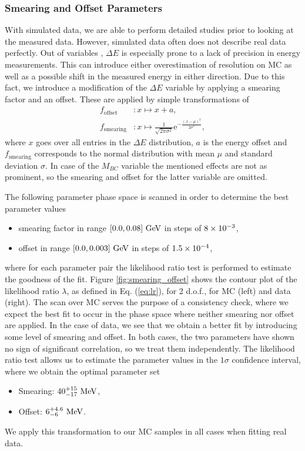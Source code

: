 \subsubsection{Smearing and Offset Parameters}\label{sec:smearing-and-offset-parameters}
With simulated data, we are able to perform detailed studies prior to looking at the measured data. However, simulated data often does not describe real data perfectly. Out of variables \vars, $\Delta E$ is especially prone to a lack of precision in energy measurements. This can introduce either overestimation of resolution on MC as well as a possible shift in the measured energy in either direction. Due to this fact, we introduce a modification of the $\Delta E$ variable by applying a smearing factor and an offset. These are applied by simple transformations of 
\begin{align}
f_{\mathrm{offset}}&: x \mapsto x + a, \\
f_{\mathrm{smearing}}&: x \mapsto \frac{1}{\sqrt{2\pi \sigma^2}} \mathrm{e}^{-\frac{(x-\mu)^2}{2\sigma^2}},
\end{align}
where $x$ goes over all entries in the $\Delta E$ distribution, $a$ is the energy offset and $f_{\mathrm{smearing}}$ corresponds to the normal distribution with mean $\mu$ and standard deviation $\sigma$. In case of the $M_{BC}$ variable the mentioned effects are not as prominent, so the smearing and offset for the latter variable are omitted. 

The following parameter phase space is scanned in order to determine the best parameter values
\begin{itemize}
	\item smearing factor in range $[0.0 ,0.08]\mathrm{~GeV}$ in steps of $8\times 10^{-3}$,
	\item offset in range $[0.0, 0.003]\mathrm{~GeV}$ in steps of $1.5\times 10^{-4}$,
\end{itemize}
where for each parameter pair the likelihood ratio test is performed to estimate the goodness of the fit. Figure \ref{fig:smearing_offset} shows the contour plot of the likelihood ratio $\lambda$, as defined in Eq. (\ref{eq:lr}), for 2 d.o.f., for MC (left) and data (right). The scan over MC serves the purpose of a consistency check, where we expect the best fit to occur in the phase space where neither smearing nor offset are applied. In the case of data, we see that we obtain a better fit by introducing some level of smearing and offset. In both cases, the two parameters have shown no sign of significant correlation, so we treat them independently. The likelihood ratio test allows us to estimate the parameter values in the $1\sigma$ confidence interval, where we obtain the optimal parameter set
\begin{itemize}
	\item Smearing: $40_{-17}^{+15}\mathrm{~MeV}$,
	\item Offset: $6_{-6}^{+4.6}\mathrm{~MeV}$.
\end{itemize}
We apply this transformation to our MC samples in all cases when fitting real data.

